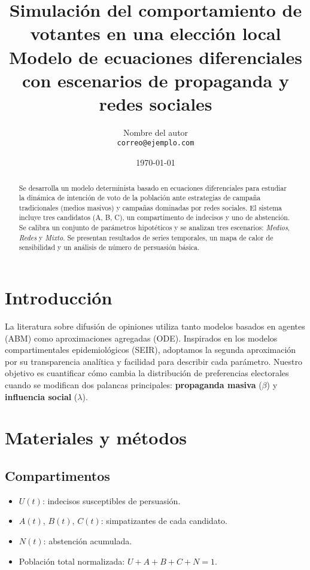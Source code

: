\documentclass[12pt,a4paper]{article}
\title{Simulación del comportamiento de votantes en una elección local\\
       \large Modelo de ecuaciones diferenciales con escenarios de propaganda y redes sociales}
\author{Nombre del autor \\ \texttt{correo@ejemplo.com}}
\date{\today}
\begin{document}
\maketitle
\begin{abstract}
Se desarrolla un modelo determinista basado en ecuaciones diferenciales para estudiar la dinámica de intención de voto de la población ante estrategias de campaña tradicionales (medios masivos) y campañas dominadas por redes sociales.
El sistema incluye tres candidatos (A, B, C), un compartimento de indecisos y uno de abstención.
Se calibra un conjunto de parámetros hipotéticos y se analizan tres escenarios: \emph{Medios}, \emph{Redes} y \emph{Mixto}.
Se presentan resultados de series temporales, un mapa de calor de sensibilidad y un análisis de número de persuasión básica.
\end{abstract}

\section{Introducción}
La literatura sobre difusión de opiniones utiliza tanto modelos basados en agentes (ABM) como aproximaciones agregadas (ODE).
Inspirados en los modelos compartimentales epidemiológicos (SEIR), adoptamos la segunda aproximación por su transparencia analítica y facilidad para describir cada parámetro.
Nuestro objetivo es cuantificar cómo cambia la distribución de preferencias electorales cuando se modifican dos palancas principales: \textbf{propaganda masiva} ($\beta$) y \textbf{influencia social} ($\lambda$).

\section{Materiales y métodos}

\subsection{Compartimentos}
\begin{itemize}
   \item $U(t)$: indecisos susceptibles de persuasión.
   \item $A(t)$, $B(t)$, $C(t)$: simpatizantes de cada candidato.
   \item $N(t)$: abstención acumulada.
   \item Población total normalizada: $U + A + B + C + N = 1$.
\end{itemize}
\end{document}

